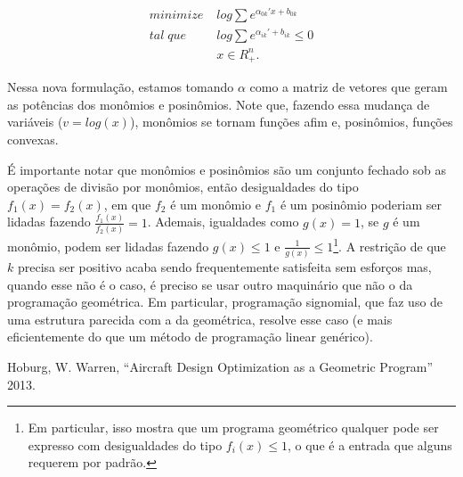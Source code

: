 \documentclass{article}
\begin{document}
\begin{align*}
  minimize \;& log \sum  e^{\alpha_{0k}'x + b_{0k}}\\
  tal\; que\;& log \sum e^{\alpha_{ik}' + b_{ik}} \leq 0\\
             & x \in R^n_{+}.
\end{align*}

Nessa nova formulação, estamos tomando $\alpha$ como a matriz de vetores que geram as potências dos monômios e posinômios. Note que, fazendo
essa mudança de variáveis ($v = log(x)$), monômios se tornam funções afim e, posinômios, funções convexas.

É importante notar que monômios e posinômios são um conjunto fechado sob as operações de divisão por monômios, então desigualdades do tipo $f_1(x) = f_2(x)$, em que $f_2$ é um monômio e $f_1$ é um posinômio poderiam ser lidadas fazendo $\frac{f_1(x)}{f_2(x)} = 1$. Ademais, igualdades como
$g(x) = 1$, se $g$ é um monômio, podem ser lidadas fazendo $g(x) \leq 1$ e $\frac{1}{g(x)} \leq 1$\footnote{Em particular, isso mostra que um programa geométrico qualquer pode ser expresso com desigualdades do tipo $f_i(x) \leq 1$, o que é a entrada que alguns  requerem por padrão.}. A restrição de que $k$ precisa ser positivo acaba sendo frequentemente satisfeita sem esforços mas, quando esse não é o caso, é preciso se usar outro maquinário que não o da programação geométrica. Em particular, programação signomial, que faz uso de uma estrutura parecida com a da geométrica, resolve esse caso (e mais eficientemente do que um método de programação linear genérico).



    \begin{thebibliography}{1}

        Hoburg, W. Warren,
        ``Aircraft Design Optimization as a Geometric Program''       
        2013.


     \end{thebibliography}
\end{document}
